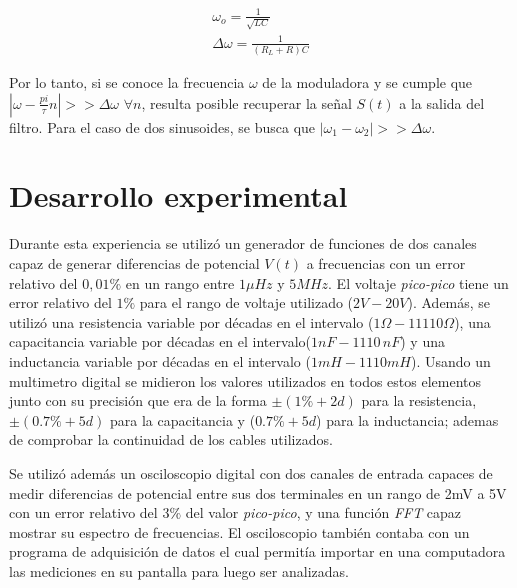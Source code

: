 \documentclass[11pt,a4paper]{article}
\begin{document}
\begin{equation}
\begin{split}
\omega_o = \frac{1}{\sqrt{LC}}\\
\Delta\omega = \frac{1}{(R_L+R)C}
\end{split}
\label{eq:antiresonante}
\end{equation}

Por lo tanto, si se conoce la frecuencia $\omega$ de la moduladora y se cumple que $|\omega-\frac{pi}{\tau}n|>> \Delta\omega$ $\forall n$, resulta posible recuperar la señal $S(t)$ a la salida del filtro. Para el caso de dos sinusoides, se busca que $|\omega_1-\omega_2|>> \Delta\omega$.



\section{Desarrollo experimental}
Durante esta experiencia se utilizó un generador de funciones de dos canales capaz de generar diferencias de potencial $V(t)$ a frecuencias con un error relativo del $0,01\%$ en un rango entre $1\mu Hz$ y $5MHz$. El voltaje \textit{pico-pico} tiene un error relativo del $1\%$ para el rango de voltaje utilizado ($2V-20V$). Además, se utilizó una resistencia variable por décadas en el intervalo ($1\Omega-11110\Omega$), una capacitancia variable por décadas en el intervalo($1nF-1110\,nF$) y una inductancia variable por décadas en el intervalo ($1mH-1110mH$). Usando un multimetro digital se midieron los valores utilizados en todos estos elementos junto con su precisión que era de la forma $\pm(1\%+2d)$ para la resistencia, $\pm(0.7\%+5d)$ para la capacitancia y ($0.7\% +5d$) para la inductancia; ademas de comprobar la continuidad de los cables utilizados.

Se utilizó además un osciloscopio digital con dos canales de entrada capaces de medir diferencias de potencial entre sus dos terminales en un rango de 2mV a 5V con un error relativo del $3\%$ del valor \textit{pico-pico}, y una función \textit{FFT} capaz mostrar su espectro de frecuencias. El osciloscopio también contaba con un programa de adquisición de datos el cual permitía importar en una computadora las mediciones en su pantalla para luego ser analizadas. 
\end{document}
